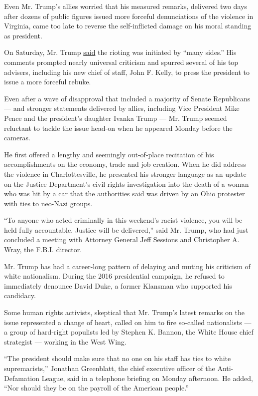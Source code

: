 Even Mr. Trump's allies worried that his measured remarks, delivered two
days after dozens of public figures issued more forceful denunciations
of the violence in Virginia, came too late to reverse the self-inflicted
damage on his moral standing as president.

On Saturday, Mr. Trump
\href{https://www.nytimes.com/2017/08/12/us/trump-charlottesville-protest-nationalist-riot.html}{said}
the rioting was initiated by ``many sides.'' His comments prompted
nearly universal criticism and spurred several of his top advisers,
including his new chief of staff, John F. Kelly, to press the president
to issue a more forceful rebuke.

Even after a wave of disapproval that included a majority of Senate
Republicans --- and stronger statements delivered by allies, including
Vice President Mike Pence and the president's daughter Ivanka Trump ---
Mr. Trump seemed reluctant to tackle the issue head-on when he appeared
Monday before the cameras.

He first offered a lengthy and seemingly out-of-place recitation of his
accomplishments on the economy, trade and job creation. When he did
address the violence in Charlottesville, he presented his stronger
language as an update on the Justice Department's civil rights
investigation into the death of a woman who was hit by a car that the
authorities said was driven by an
\href{https://www.nytimes.com/2017/08/13/us/james-alex-fields-charlottesville-driver-.html}{Ohio
protester} with ties to neo-Nazi groups.

``To anyone who acted criminally in this weekend's racist violence, you
will be held fully accountable. Justice will be delivered,'' said Mr.
Trump, who had just concluded a meeting with Attorney General Jeff
Sessions and Christopher A. Wray, the F.B.I. director.

Mr. Trump has had a career-long pattern of delaying and muting his
criticism of white nationalism. During the 2016 presidential campaign,
he refused to immediately denounce David Duke, a former Klansman who
supported his candidacy.

Some human rights activists, skeptical that Mr. Trump's latest remarks
on the issue represented a change of heart, called on him to fire
so-called nationalists --- a group of hard-right populists led by
Stephen K. Bannon, the White House chief strategist --- working in the
West Wing.

``The president should make sure that no one on his staff has ties to
white supremacists,'' Jonathan Greenblatt, the chief executive officer
of the Anti-Defamation League, said in a telephone briefing on Monday
afternoon. He added, ``Nor should they be on the payroll of the American
people.''

